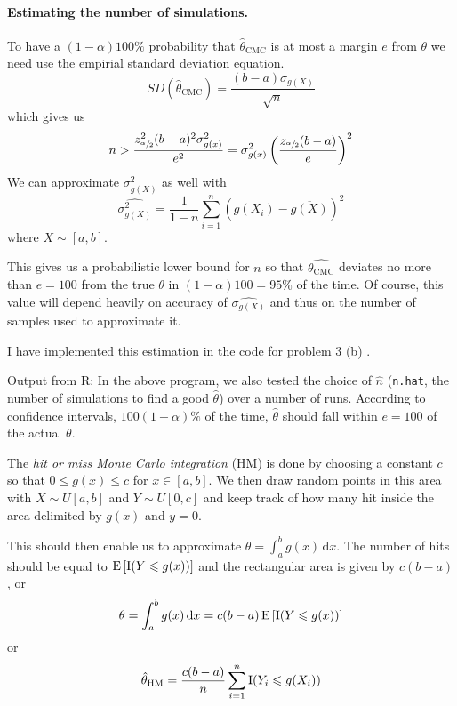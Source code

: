 \documentclass[a4paper,english,12pt]{article}
\begin{document}
\paragraph{Estimating the number of simulations.}

To have a $(1 - \alpha) 100\%{}$ probability that $\hat{\theta}_{\textrm{CMC}}$
is at most a margin $e$ from $\theta$ we need use the empirial standard
deviation equation.
\[
  SD(\hat{\theta}_{\textrm{CMC}}) = \frac{(b - a)\sigma_{g(X)}}{\sqrt{n}}
\]
which gives us
\[
  n > \frac{z_{\sfrac{\alpha}{2}}^2 (b - a)^2 \sigma_{g(x)}^2 }{e^2}
    = \sigma_{g(x)}^2
        \left(
            \frac{z_{\sfrac{\alpha}{2}}(b - a)}{e}
          \right)^2
\]
We can approximate $\sigma_{g(X)}^2$ as well with
\[
  \widehat{\sigma_{g(X)}^2} = \frac{1}{1 - n} \sum_{i=1}^n \left(
        g(X_i) - \overline{g(X)} \right)^2
\]
where $X \sim [a, b]$.

This gives us a probabilistic lower bound for $n$ so that
$\hat{\theta_{\textrm{CMC}}}$ deviates no more than $e = 100$ from the true
$\theta$ in $(1 - \alpha)100 = 95\%{}$ of the time. Of course, this value will
depend heavily on accuracy of $\widehat{\sigma_{g(X)}}$ and thus on the number
of samples used to approximate it.

I have implemented this estimation in the code for problem 3 (b)
.

\label{problem:3b}
Output from R:
In the above program, we also tested the choice of $\hat{n}$ (\texttt{n.hat},
the number of simulations to find a good $\hat{\theta}$) over a number of runs.
According to confidence intervals, $100(1 - \alpha)\%{}$ of the time,
$\hat{\theta}$ should fall within $e = 100$ of the actual $\theta$.

The \textit{hit or miss Monte Carlo integration} (HM) is done by choosing a
constant $c$ so that $0 \leqslant g(x) \leqslant c$ for $x \in [a,b]$. We then
draw random points in this area with $X \sim U[a, b]$ and $Y \sim U[0, c]$ and
keep track of how many hit inside the area delimited by
$g(x)$ and $y=0$.

This should then enable us to approximate $\theta = \int_a^b
g(x)\, \textrm{d}x$. The number of hits should be equal to
$\mathrm{E}\left[ \mathrm{I}(Y \leqslant g(x)) \right]$ and the rectangular area is given by
$c(b-a)$, or
\[
  \theta = \int_a^b g(x)\, \textrm{d}x
    = c(b-a)\, \mathrm{E}\left[ \mathrm{I}(Y \leqslant g(x)) \right]
\]
or
\[
  \hat{\theta}_{\textrm{HM}} =
    \frac{c(b-a)}{n} \sum_{i=1}^n \mathrm{I}(Y_i \leqslant g(X_i))
\]
\end{document}
